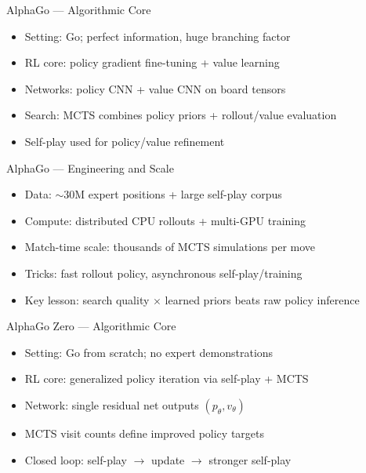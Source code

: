 \documentclass[aspectratio=169]{beamer}
\begin{document}

\begin{frame}{AlphaGo --- Algorithmic Core}
\begin{itemize}
  \item Setting: Go; perfect information, huge branching factor
  \item RL core: policy gradient fine-tuning + value learning
  \item Networks: policy CNN + value CNN on board tensors
  \item Search: MCTS combines policy priors + rollout/value evaluation
  \item Self-play used for policy/value refinement
\end{itemize}
\end{frame}

\begin{frame}{AlphaGo --- Engineering and Scale}
\begin{itemize}
  \item Data: $\sim 30$M expert positions + large self-play corpus
  \item Compute: distributed CPU rollouts + multi-GPU training
  \item Match-time scale: thousands of MCTS simulations per move
  \item Tricks: fast rollout policy, asynchronous self-play/training
  \item Key lesson: search quality $\times$ learned priors beats raw policy inference
\end{itemize}
\end{frame}

\begin{frame}{AlphaGo Zero --- Algorithmic Core}
\begin{itemize}
  \item Setting: Go from scratch; no expert demonstrations
  \item RL core: generalized policy iteration via self-play + MCTS
  \item Network: single residual net outputs $(p_\theta,v_\theta)$
  \item MCTS visit counts define improved policy targets
  \item Closed loop: self-play $\rightarrow$ update $\rightarrow$ stronger self-play
\end{itemize}
\end{frame}
\end{document}
